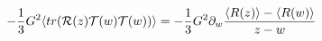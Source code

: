 \begin{equation}
\label{c2}
-\frac{1}{3} G^2 \langle tr({\cal R}(z) {\cal T}(w) {\cal T}(w)) \rangle  
=- \frac{1}{3}
G^2 \partial_w \frac{\langle R(z)\rangle -\langle R(w)\rangle}{z-w}
\end{equation}

